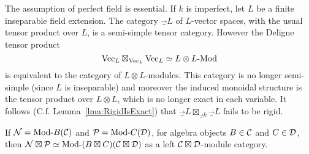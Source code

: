 \documentclass{amsart}
\begin{document}
\begin{example}
	The assumption of perfect field is essential. If $k$ is imperfect, let $L$ be a finite inseparable field extension. The category $\Vec_L$ of $L$-vector spaces, with the usual tensor product over $L$, is a semi-simple tensor category. However the Deligne tensor product
	\begin{equation*}
		\Vec_L \boxtimes_{\Vec_k} \Vec_L \simeq \Mod{L\otimes L}{}
	\end{equation*} 
	is equivalent to the category of $L \otimes L$-modules. This category is no longer semi-simple (since $L$ is inseparable) and moreover the induced monoidal structure is the tensor product over $L \otimes L$, which is no longer exact in each variable. It follows (C.f. Lemma~\ref{lma:RigidIsExact}) that $\Vec_L \boxtimes_{\Vec_k} \Vec_L$ fails to be rigid. 
\end{example}

\begin{proposition}
	If $\cN = \Mod{}{B}(\cC)$ and $\cP = \Mod{}{C}(\cD)$, for algebra objects $B \in \mathcal C$ and $C \in \mathcal D$, then $\cN \boxtimes \cP \simeq \Mod{}{(B \boxtimes C)}(\cC \boxtimes \cD)$ as a left $\mathcal C \boxtimes \mathcal D$-module category.
\end{proposition}
\end{document}
